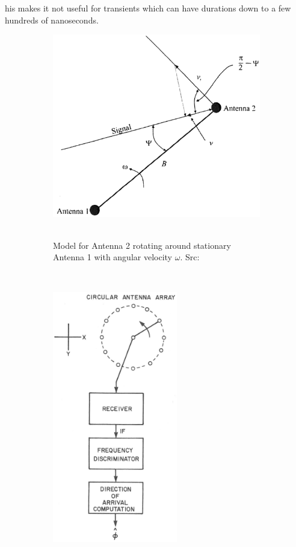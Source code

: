 his makes it not useful for transients which can have durations down to a few hundreds of nanoseconds.

\begin{figure}
  \centering
  \begin{subfigure}[b]{0.48\textwidth}
    \centering
    \includegraphics[width=\textwidth]{./img/lit_review/doppler-2-antenna}
    ~ 
    \caption{Model for Antenna 2 rotating around stationary Antenna 1 with angular velocity \(\omega\). Src: \cite{poisel2012electronic}}
  \end{subfigure}
  ~
  \begin{subfigure}[b]{0.48\textwidth}
    \centering
    \includegraphics[width=0.6\textwidth]{./img/lit_review/doppler-switching}

\end{subfigure}
\end{figure}
